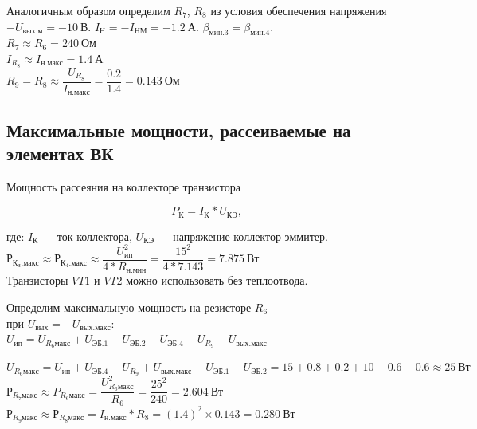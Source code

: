 Аналогичным образом определим $ R_7 $, $ R_8 $ 
из условия обеспечения напряжения 
$ -U_{вых.м} = -10~В $. 
$ I_{Н} = -I_{НМ} = -1.2~А $.
$ \beta_{мин. 3} = \beta_{мин. 4} $.\\

$ R_7 \approx R_6 = 240~Ом $\\

$ I_{R_8} \approx I_{н. макс} = 1.4~А $\\

$
R_9 = R_8 \approx 
\dfrac{U_{R_8}}{I_{н. макс}} = 
\dfrac{0.2}{1.4} = 0.143~Ом
$\\

\subsection{Максимальные мощности, рассеиваемые на элементах ВК}

Мощность рассеяния на коллекторе транзистора

$$ P_К = I_К * U_{КЭ}, $$

где: 
$ I_К $ --- ток коллектора,
$ U_{КЭ} $ --- напряжение коллектор-эммитер.\\

$
Р_{К_З. макс} \approx
Р_{К_4. макс} \approx
\dfrac{U_{ип}^2}{4 * R_{н. мин}} =
\dfrac{15^2}{4 * 7.143} =
7.875~Вт
$\\

Транзисторы $ VT1 $ и $ VT2 $
можно использовать без теплоотвода.

Определим максимальную мощность
на резисторе $ R_6 $\\
при $ U_{вых} = -U_{вых. макс} $:\\

$
U_{ип} =
U_{R_6 макс} + U_{ЭБ. 1} + U_{ЭБ. 2} - 
U_{ЭБ. 4} - U_{R_9} - U_{вых. макс}
$

$
U_{R_6 макс} =
U_{ип} + U_{ЭБ. 4} + U_{R_9} + U_{вых. макс} 
- U_{ЭБ. 1} - U_{ЭБ. 2} =
15 + 0.8 + 0.2 + 10 - 0.6 - 0.6 \approx
25~Вт
$\\

$ 
Р_{R_7 макс} \approx
P_{R_6 макс} = 
\dfrac{U_{R_6 макс}^2}{R_6} = 
\dfrac{25^2}{240} =
2.604~Вт
$\\

$
Р_{R_9 макс} \approx
Р_{R_8 макс} = 
I_{н. макс} * R_8 = 
(1.4)^2 \times 0.143 = 
0.280~Вт
$

